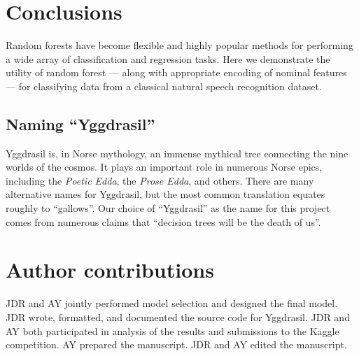 \documentclass[11pt,a4paper]{article}
\begin{document}
\section{Conclusions}
Random forests have become flexible and highly popular methods for performing a wide array of classification and regression tasks. Here we demonstrate the utility of random forest --- along with appropriate encoding of nominal features --- for classifying data from a classical natural speech recognition dataset.

\subsection{Naming ``Yggdrasil''}
Yggdrasil is, in Norse mythology, an immense mythical tree connecting the nine worlds of the cosmos. It plays an important role in numerous Norse epics, including the \textit{Poetic Edda}, the \textit{Prose Edda}, and others. There are many alternative names for Yggdrasil, but the most common translation equates roughly to ``gallows''. Our choice of ``Yggdrasil'' as the name for this project comes from numerous claims that ``decision trees will be the death of us''.

\section{Author contributions}
JDR and AY jointly performed model selection and designed the final model. JDR wrote, formatted, and documented the source code for Yggdrasil. JDR and AY both participated in analysis of the results and submissions to the Kaggle competition. AY prepared the manuscript. JDR and AY edited the manuscript.




\end{document}

